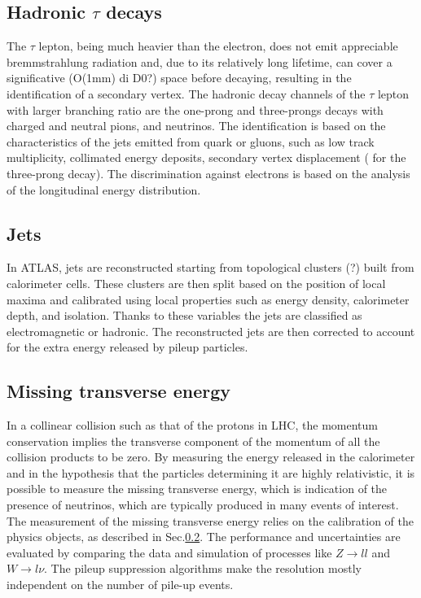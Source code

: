 \documentclass[a4paper,twoside,12pt]{article}
\begin{document}
\subsection{Hadronic $\tau$ decays}
The $\tau$ lepton, being much heavier than the electron, does not emit appreciable 
bremmstrahlung radiation and, due to its relatively long lifetime, can cover a significative 
(O(1mm) di D0?) space before decaying, resulting in the identification of a secondary vertex.
The hadronic decay channels of the $\tau$ lepton with larger branching ratio are the 
one-prong and three-prongs decays with charged and neutral pions, and neutrinos. The
identification is based on the characteristics of the jets emitted from quark or gluons, such 
as low track multiplicity, collimated energy deposits, secondary vertex displacement (
for the three-prong decay). The discrimination against electrons is based on the analysis
of the longitudinal energy distribution. 

\subsection{Jets}\label{subsec:jets}
In ATLAS, jets are reconstructed starting from topological clusters (?) built from calorimeter cells. These clusters are then split based on the position of local maxima and calibrated using
local properties such as energy density, calorimeter depth, and isolation. Thanks to these 
variables the jets are classified as electromagnetic or hadronic. The reconstructed jets are
then corrected to account for the extra energy released by pileup particles.

\subsection{Missing transverse energy}
In a collinear collision such as that of the protons in LHC, the momentum conservation 
implies the transverse component of the momentum of all the collision products to be zero. 
By measuring the energy released in the calorimeter and in the hypothesis that the particles determining it are highly relativistic, it is possible to measure the missing transverse energy, 
which is indication of the presence of neutrinos, which are typically produced in many events 
of interest. The measurement of the missing transverse energy relies on the calibration of the 
physics objects, as described in Sec.\ref{subsec:jets}. The performance and uncertainties are 
evaluated by comparing the data and simulation of processes like $Z \rightarrow ll$ and 
$W \rightarrow l\nu$. The pileup suppression algorithms make the resolution mostly independent on
the number of pile-up events.
\end{document}
